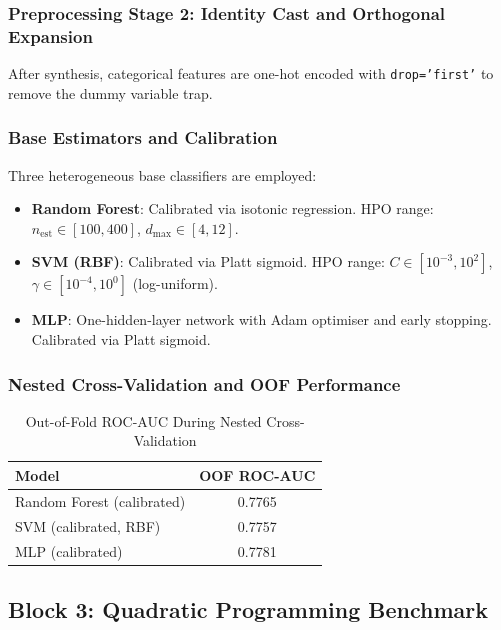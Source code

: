 \documentclass[12pt,a4paper]{article}
\begin{document}
\subsubsection{Preprocessing Stage 2: Identity Cast and Orthogonal Expansion}

After synthesis, categorical features are one-hot encoded with \texttt{drop='first'} to remove the dummy variable trap.

\subsubsection{Base Estimators and Calibration}

Three heterogeneous base classifiers are employed:

\begin{itemize}
    \item \textbf{Random Forest}: Calibrated via isotonic regression. HPO range: $n_\text{est} \in [100, 400]$, $d_\text{max} \in [4, 12]$.
    \item \textbf{SVM (RBF)}: Calibrated via Platt sigmoid. HPO range: $C \in [10^{-3}, 10^2]$, $\gamma \in [10^{-4}, 10^0]$ (log-uniform).
    \item \textbf{MLP}: One-hidden-layer network with Adam optimiser and early stopping. Calibrated via Platt sigmoid.
\end{itemize}

\subsubsection{Nested Cross-Validation and OOF Performance}

\begin{table}[H]
\centering
\caption{Out-of-Fold ROC-AUC During Nested Cross-Validation}
\label{tab:oofresults}
\begin{tabular}{lc}
\toprule
\textbf{Model} & \textbf{OOF ROC-AUC} \\
\midrule
Random Forest (calibrated) & 0.7765 \\
SVM (calibrated, RBF)      & 0.7757 \\
MLP (calibrated)           & 0.7781 \\
\bottomrule
\end{tabular}
\end{table}

\subsection{Block 3: Quadratic Programming Benchmark}
\end{document}
